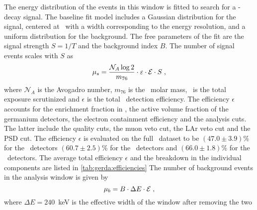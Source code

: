 \begin{sidewaystable}
  \centering
  \caption{%
    Summary of the parameters of interest for \gerdatwo\ for different detector types and
    before/after the upgrade.  The components of the total efficiency $\epsilon$ for
    \onbb\ decays are also reported individually. The efficiency factors due to muon veto
    and quality cuts are above $99.9\%$ and are not shown explicitly.  Energy resolution
    and all \onbb\ decay efficiencies are reported as exposure-weighted average for each
    detector type and their uncertainties are given as standard deviation.
  }\label{tab:gerda:efficiencies}
  
\end{sidewaystable}

The energy distribution of the events in this window is fitted to search for a \onbb-decay
signal. The baseline fit model includes a Gaussian distribution for the signal, centered
at \qbb\ with a width corresponding to the energy resolution, and a uniform distribution
for the background. The free parameters of the fit are the signal strength $S=1/T$ and the
background index $B$. The number of signal events scales with $S$ as
\begin{equation}\label{eq:gerda:mu_s}
  \mu_s = \frac{\mathcal{N}_A \log2}{m_{76}} \cdot \varepsilon \cdot \mathcal{E} \cdot S \;,
\end{equation}
where $\mathcal{N}_A$ is the Avogadro number, $m_{76}$ is the \gesix\ molar mass, \expo\
is the total exposure scrutinized and $\epsilon$ is the total \onbb\ detection efficiency.
The efficiency $\epsilon$ accounts for the enrichment fraction in \gesix, the active
volume fraction of the germanium detectors, the electron containment efficiency and the
analysis cuts. The latter include the quality cuts, the muon veto cut, the LAr veto cut
and the PSD cut. The efficiency $\epsilon$ is evaluated on the full \phasetwo\ dataset to
be $(47.0 \pm 3.9)$\% for the \scoax\ detectors $(60.7 \pm 2.5)$\% for the \bege\ detectors
and $(66.0 \pm 1.8)$\% for the \icoax\ detectors. The average total efficiency $\epsilon$
and the breakdown in the individual components are listed in \cref{tab:gerda:efficiencies}
The number of background events in the analysis window is given by
\begin{equation}\label{eq:gerda:mu_b}
  \mu_b = B \cdot \Delta{}E \cdot \mathcal{E} \;,
\end{equation}
where $\Delta{}E = 240$~keV is the effective width of the window after removing the two
